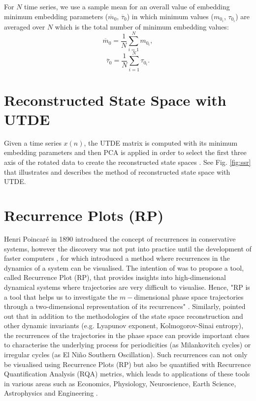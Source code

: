 For $N$ time series, we use a sample mean for an overall value of 
embedding minimum embedding parameters 
($\overline{m}_0$, $\overline{\tau}_0$) in which minimum values 
($m_{0_i}$, $\tau_{0_i}$) are averaged over $N$ which is the total number 
of minimum embedding values:
\begin{equation}
	\overline{m}_0= \frac{1}{N} \sum^{N}_{i = 1} m_{0_i},
\end{equation}
\begin{equation}
	\overline{\tau}_0= \frac{1}{N} \sum^{N}_{i = 1} \tau_{0_i}.
\end{equation}

\section{Reconstructed State Space with UTDE} \label{sec:rsswithUTDE}

Given a time series $x(n)$, the UTDE matrix is computed with its 
minimum embedding parameters and then PCA is applied in order to select 
the first three axis of the rotated data to create the reconstructed 
state spaces \citep{frank2010, sama2013}.
See Fig. \ref{fig:ssr} that illustrates and describes the method of 
reconstructed state space with UTDE.

\section{Recurrence Plots (RP)}
Henri Poincar\'e in 1890 introduced the concept of recurrences in 
conservative systems, however the discovery was not put into practice until 
the development of faster computers \citep{marwan2007}, for which 
\cite{eckmann1987} introduced a method where recurrences in the dynamics of 
a system can be visualised.
The intention of \cite{eckmann1987}  was to propose a tool,
called Recurrence Plot (RP), that provides insights into high-dimensional 
dynamical systems where trajectories are very difficult to visualise.
Hence, "RP is a tool that helps us to investigate the 
$m-$dimensional phase space trajectories through a two-dimensional 
representation of its recurrences" \citep[p. 7]{marwan2015}.
Similarly, \cite{marwan2015} pointed out that in addition to the 
methodologies of the state space reconstruction and other dynamic invariants 
(e.g. Lyapunov exponent, Kolmogorov-Sinai entropy), the recurrences of the 
trajectories in the phase space can provide important clues to characterise 
the underlying process for periodicities (as Milankovitch cycles) or 
irregular cycles (as El Ni\~no Southern Oscillation). 
Such recurrences can not only be visualised using Recurrence Plots (RP) 
but also be quantified with Recurrence Quantification Analysis (RQA) metrics, 
which leads to applications of these tools in various areas such as Economics, 
Physiology, Neuroscience, Earth Science, Astrophysics and Engineering 
\citep{marwan2007}.

